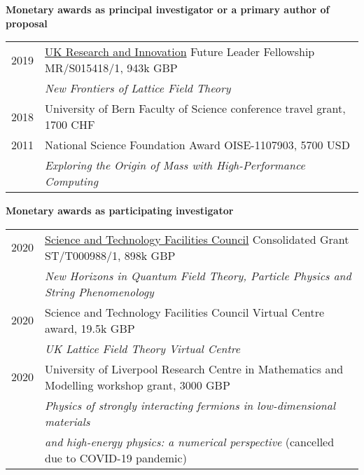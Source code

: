 \renewenvironment{spacelist} {
  \begin{list} {} {
    \setlength{\topsep}{-8 pt}
    \setlength{\itemsep}{5 pt}
    \setlength{\leftmargin}{-1.15 in}
  }
}{
  \end{list}
}

\raggedright
\vspace{12 pt}
\begin{spacelist}
  \item {\large \bfseries Monetary awards as principal investigator or a primary author of proposal} \\[10 pt]
    \begin{tabular}[t]{cl}
      2019 & \href{https://www.ukri.org}{UK Research and Innovation} Future Leader Fellowship {MR/S015418/1}, 943k GBP \\
           & \textit{New Frontiers of Lattice Field Theory}                                                            \\[6 pt]
      2018 & University of Bern Faculty of Science conference travel grant, 1700 CHF                                   \\[6 pt]
      2011 & National Science Foundation Award OISE-1107903, 5700 USD                                                  \\
           & \textit{Exploring the Origin of Mass with High-Performance Computing}                                     \\
    \end{tabular}

  \spacer
  \item {\large \bfseries Monetary awards as participating investigator} \\[10 pt]
    \begin{tabular}[t]{cl}
      2020 & \href{https://stfc.ukri.org}{Science and Technology Facilities Council} Consolidated Grant {ST/T000988/1}, 898k GBP \\
           & \textit{New Horizons in Quantum Field Theory, Particle Physics and String Phenomenology}                            \\[6 pt]
      2020 & Science and Technology Facilities Council Virtual Centre award, 19.5k GBP                                           \\
           & \textit{UK Lattice Field Theory Virtual Centre}                                                                     \\[6 pt]
      2020 & University of Liverpool Research Centre in Mathematics and Modelling workshop grant, 3000 GBP                       \\
           & \textit{Physics of strongly interacting fermions in low-dimensional materials}                                      \\
           & \hspace{2.4 cm} \textit{and high-energy physics: a numerical perspective} (cancelled due to COVID-19 pandemic)      \\
    \end{tabular}


\end{spacelist}
